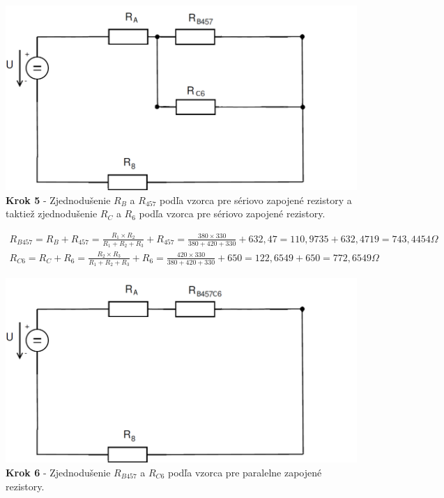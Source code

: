 \begin{center}
\includegraphics[scale=0.5,keepaspectratio]{fig/obr/Pr1_5.png} \\
\textbf{Krok 5} - Zjednodušenie $R_{B}$ a $R_{457}$ podľa vzorca pre sériovo zapojené rezistory a taktiež zjednodušenie $R_{C}$ a $R_{6}$ podľa vzorca pre sériovo zapojené rezistory.
\end{center}

\begin{gather*}
R_{B457}=R_{B}+R_{457}=\frac{R_{1} \times R_{2}}{R_{1}+R_{2}+R_{3}}+R_{457}=\frac{380  \times 330}{380+420+330}+632,47=110,9735+632,4719=743,4454\Omega \\
R_{C6}=R_{C}+R_{6}=\frac{R_{2} \times R_{3}}{R_{1}+R_{2}+R_{3}}+R_{6}=\frac{420 \times 330}{380+420+330}+650=122,6549+650=772,6549\Omega 
\end{gather*}

 
\begin{center}
\includegraphics[scale=0.5,keepaspectratio]{fig/obr/Pr1_6.png} \\
\textbf{Krok 6} - Zjednodušenie $R_{B457}$ a $R_{C6}$ podľa vzorca pre paralelne zapojené rezistory.
\end{center}

